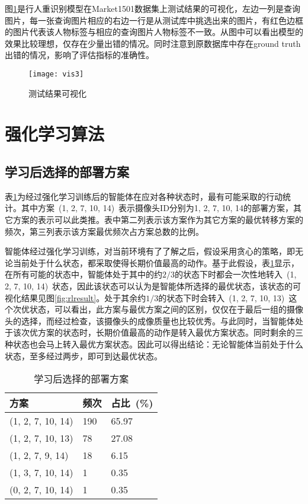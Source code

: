 图\ref{fig:testvis}是行人重识别模型在Market1501数据集上测试结果的可视化，左边一列是查询图片，每一张查询图片相应的右边一行是从测试库中挑选出来的图片，有红色边框的图片代表该人物标签与相应的查询图片人物标签不一致。从图中可以看出模型的效果比较理想，仅存在少量出错的情况。同时注意到原数据库\cite{zheng2015scalable}中存在ground truth出错的情况，影响了评估指标的准确性。

\begin{figure}[!ht]
    \centering
    \texttt{[image: vis3]}
    \caption{测试结果可视化}
    \label{fig:testvis}
\end{figure}

\section{强化学习算法}

\subsection{学习后选择的部署方案}

表\ref{tab:rlresult}为经过强化学习训练后的智能体在应对各种状态时，最有可能采取的行动统计。其中方案~(1, 2, 7, 10, 14)~表示摄像头ID分别为1, 2, 7, 10, 14的部署方案，其它方案的表示可以此类推。表中第二列表示该方案作为其它方案的最优转移方案的频次，第三列表示该方案最优频次占方案总数的比例。

智能体经过强化学习训练，对当前环境有了了解之后，假设采用贪心的策略，即无论当前处于什么状态，都采取使得长期价值最高的动作。基于此假设，表\ref{tab:rlresult}显示，在所有可能的状态中，智能体处于其中的约$2/3$的状态下时都会一次性地转入~(1, 2, 7, 10, 14)~状态，因此该状态可以认为是智能体所选择的最优状态，该状态的可视化结果见图\ref{fig:rlresult}。处于其余约$1/3$的状态下时会转入~(1, 2, 7, 10, 13)~这个次优状态，可以看出，此方案与最优方案之间的区别，仅仅在于最后一组的摄像头的选择，而经过检查，该摄像头的成像质量也比较优秀。与此同时，当智能体处于该次优方案的状态时，长期价值最高的动作是转入最优方案状态。同时剩余的三种状态也会马上转入最优方案状态。因此可以得出结论：无论智能体当前处于什么状态，至多经过两步，即可到达最优状态。

\begin{table}[h!]
    \centering
    \caption{学习后选择的部署方案}
    \label{tab:rlresult}
    \begin{tabularx}{\textwidth}{p{}p{}p{}}
    \toprule
    方案               & 频次  & 占比~(\%)  \\ \midrule
    (1, 2, 7, 10, 14) & 190 & 65.97 \\
    (1, 2, 7, 10, 13) & 78  & 27.08 \\
    (1, 2, 7, 9, 14)  & 18  & 6.15  \\
    (1, 3, 7, 10, 14) & 1   & 0.35  \\
    (0, 2, 7, 10, 14) & 1   & 0.35  \\ \bottomrule
    \end{tabularx}
\end{table}

